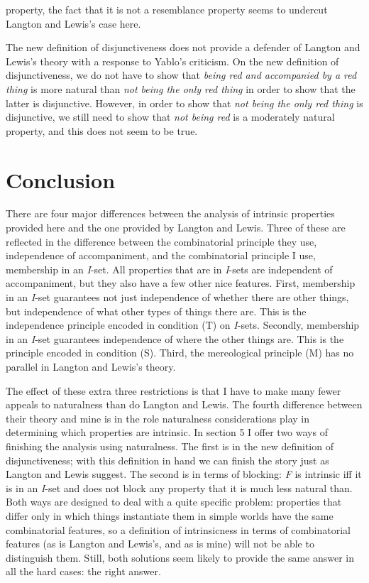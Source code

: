 property, the fact that it is not a resemblance property seems to undercut Langton and Lewis's case here.

The new definition of disjunctiveness does not provide a defender of Langton and Lewis's theory with a response to Yablo's criticism. On the new definition of disjunctiveness, we do not have to show that \textit{being red and accompanied by a red thing} is more natural than \textit{not being the only red thing} in order to show that the latter is disjunctive. However, in order to show that \textit{not being the only red thing} is disjunctive, we still need to show that \textit{not being red} is a moderately natural property, and this does not seem to be true.


\section{Conclusion}
There are four major differences between the analysis of intrinsic properties provided here and the one provided by Langton and Lewis. Three of these are reflected in the difference between the combinatorial principle they use, independence of accompaniment, and the combinatorial principle I use, membership in an \textit{I}\nobreakdash-set. All properties that are in \textit{I}\nobreakdash-sets are independent of accompaniment, but they also have a few other nice features. First, membership in an \textit{I}\nobreakdash-set guarantees not just independence of whether there are other things, but independence of what other types of things there are. This is the independence principle encoded in condition (T) on \textit{I}\nobreakdash-sets. Secondly, membership in an \textit{I}\nobreakdash-set guarantees independence of where the other things are. This is the principle encoded in condition (S). Third, the mereological principle (M) has no parallel in Langton and Lewis's theory.

The effect of these extra three restrictions is that I have to make many fewer appeals to naturalness than do Langton and Lewis. The fourth difference between their theory and mine is in the role naturalness considerations play in determining which properties are intrinsic. In section 5 I offer two ways of finishing the analysis using naturalness. The first is in the new definition of disjunctiveness; with this definition in hand we can finish the story just as Langton and Lewis suggest. The second is in terms of blocking: \textit{F} is intrinsic iff it is in an \textit{I}\nobreakdash-set and does not block any property that it is much less natural than. Both ways are designed to deal with a quite specific problem: properties that differ only in which things instantiate them in simple worlds have the same combinatorial features, so a definition of intrinsicness in terms of combinatorial features (as is Langton and Lewis's, and as is mine) will not be able to distinguish them. Still, both solutions seem likely to provide the same answer in all the hard cases: the right answer. 




